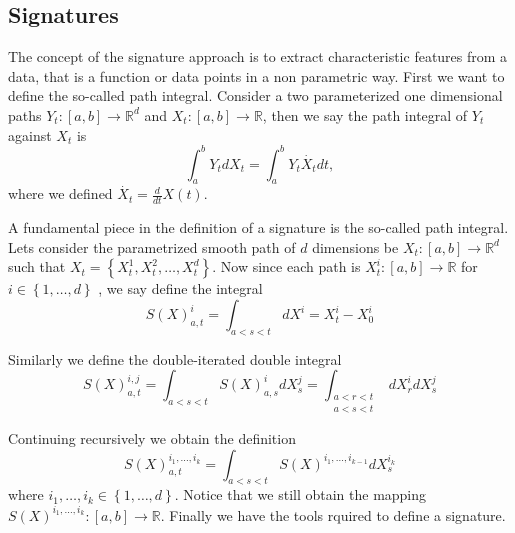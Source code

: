 

\subsection{Signatures}%
\label{sec:background}



The concept of the signature approach is to extract characteristic features from a data, that is a function or data points in a non parametric way.
First we want to define the so-called path integral.
Consider a two parameterized one dimensional paths  $Y_{t}: [a,b] \to  \mathbb{R} ^{d} $ and $X_t: [a,b] \to \mathbb{R} $, then we say the path integral of $Y_{t}$ against $X_{t}$  is \begin{equation}
    \int_{a}^{b} Y_{t} dX_{t} = \int_{a}^{b}  Y_{t} \dot{X_{t}}dt,
\end{equation}  where we defined $ \dot{X_{t}} = \frac{d}{dt}X( t)   $.



A fundamental piece in the definition of a signature is
the so-called path integral.
Lets consider the parametrized smooth path of $d$ dimensions be $X_{t}: \left[ a,b \right] \to  \mathbb{R} ^{d}  $ such that $X_{t} = \left\{ X^{1}_{t},  X_{t}^{2}, \ldots, X_{t}^{d} \right\} $. Now since each path is $X^{i}_{t}: [a,b] \to
\mathbb{R} $ for $i \in \left\{ 1, \ldots, d \right\} $ , we say define the integral \begin{equation}
    S( X)_{a,t}^{i} =  \int_{a < s < t}^{} dX^{i} = X^{i}_{t} - X_{0}^{i}
\end{equation}

Similarly we define the double-iterated double integral \begin{equation*}
    S( X)^{i,j}_{a,t} = \int_{a < s<t}^{} S( X)_{a,s}^{i}dX^{j}_{s} = \int_{\substack{a < r < t \\ a < s < t}}^{} dX^{i}_{r} dX^{j}_{s}
\end{equation*}


 Continuing recursively we obtain the definition \begin{equation*}
     S( X) _{a,t}^{i_{1},\ldots, i_{k}} =  \int_{a < s <t}^{} S( X) ^{i_{1}, \ldots, i_{k-1}} dX^{i_{k}}_{s}
 \end{equation*}
 where $i_{1}, \ldots, i_{k} \in \left\{ 1, \ldots, d \right\} $. Notice that we still obtain the mapping $S( X)^{i_{1}, \ldots, i_{k}}: [a,b] \to \mathbb{R}  $.  Finally we have the tools rquired to define a signature.

